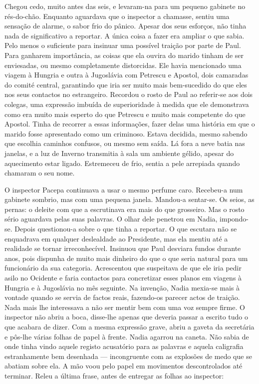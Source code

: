 Chegou cedo, muito antes das seis, e levaram-na para um pequeno gabinete
no rés-do-chão. Enquanto aguardava que o inspector a chamasse, sentiu
uma sensação de alarme, o sabor frio do pânico. Apesar dos seus
esforços, não tinha nada de significativo a reportar. A única coisa a
fazer era ampliar o que sabia. Pelo menos o suficiente para insinuar uma
possível traição por parte de Paul. Para ganharem importância, as coisas
que ela ouvira do marido tinham de ser enviesadas, ou mesmo
completamente distorcidas. Ele havia mencionado uma viagem à Hungria e
outra à Jugoslávia com Petrescu e Apostol, dois camaradas do comité
central, garantindo que iria ser muito mais
bem-sucedido do que eles nos seus contactos no estrangeiro. Recordou o
rosto de Paul ao referir-se aos dois colegas, uma expressão imbuída de
superioridade à medida que ele demonstrava como era muito mais esperto
do que Petrescu e muito mais competente do que Apostol. Tinha de
recorrer a essas informações, fazer delas uma história em que o marido
fosse apresentado como um criminoso. Estava decidida, mesmo sabendo que
escolhia caminhos confusos, ou mesmo sem saída. Lá fora a neve batia nas
janelas, e a luz de Inverno transmitia à sala um ambiente gélido, apesar
do aquecimento estar ligado. Estremeceu de frio, sentia a pele arrepiada
quando chamaram o seu nome.

O inspector Pacepa continuava a usar o mesmo perfume caro. Recebeu-a num gabinete sombrio, mas com uma pequena janela.
Mandou-a sentar-se. Os seios, as pernas: o deleite com que a escrutinava
era mais do que grosseiro. Mas o rosto sério aguardava pelas suas
palavras. O olhar dele penetrou em Nadia, impondo-se. Depois
questionou-a sobre o que tinha a reportar. O que escutara não se
enquadrava em qualquer deslealdade ao Presidente, mas ela mentiu até a
realidade se tornar irreconhecível. Insinuou que Paul desviara fundos
durante anos, pois dispunha de muito mais dinheiro do que o que seria
natural para um funcionário da sua categoria. Acrescentou que
suspeitava de que ele iria pedir asilo no Ocidente e faria contactos
para concretizar esses planos em viagens à Hungria e à Jugoslávia no
mês seguinte. Na invenção, Nadia mexia-se mais à vontade quando se
servia de factos reais, fazendo-os parecer actos de traição. Nada mais
lhe interessava a não ser mentir bem com uma voz sempre firme. O inspector não
abriu a boca, disse-lhe apenas que deveria passar a escrito tudo o que
acabara de dizer. Com a mesma expressão grave, abriu a gaveta da
secretária e pôs-lhe várias folhas de papel à frente. Nadia agarrou na
caneta. Não sabia de onde tinha vindo aquele registo acusatório para as
palavras e aquela caligrafia estranhamente bem desenhada ---
incongruente com as explosões de medo que se abatiam sobre ela. A mão
voou pelo papel em movimentos descontrolados até terminar. Releu a
última frase, antes de entregar as folhas ao inspector:

